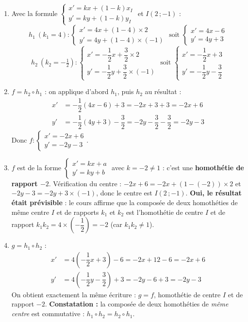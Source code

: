 \documentclass[11pt]{article}
\newcommand{\cle}[1]{{\popxbold\color{popdark}#1}}
\begin{document}
\begin{corrige}
\begin{enumerate}
\item Avec la formule $\begin{cases} x' = kx + (1-k)x_I \\ y' = ky + (1-k)y_I \end{cases}$ et $I(2\,;-1)$ :
\[ h_1 \ (k_1 = 4) : \begin{cases} x' = 4x + (1-4)\times 2 \\ y' = 4y + (1-4)\times(-1) \end{cases} \text{ soit } \begin{cases} x' = 4x - 6 \\ y' = 4y + 3 \end{cases} \]
\[ h_2 \ (k_2 = -\tfrac{1}{2}) : \begin{cases} x' = -\dfrac{1}{2}x + \dfrac{3}{2}\times 2 \\ y' = -\dfrac{1}{2}y + \dfrac{3}{2}\times(-1) \end{cases} \text{ soit } \begin{cases} x' = -\dfrac{1}{2}x + 3 \\ y' = -\dfrac{1}{2}y - \dfrac{3}{2} \end{cases} \]
\item $f = h_2 \circ h_1$ : on applique d'abord $h_1$, puis $h_2$ au résultat :
\begin{align*}
x' &= -\dfrac{1}{2}(4x - 6) + 3 = -2x + 3 + 3 = -2x + 6 \\
y' &= -\dfrac{1}{2}(4y + 3) - \dfrac{3}{2} = -2y - \dfrac{3}{2} - \dfrac{3}{2} = -2y - 3
\end{align*}
Donc $f : \begin{cases} x' = -2x + 6 \\ y' = -2y - 3 \end{cases}$.
\item $f$ est de la forme $\begin{cases} x' = kx + a \\ y' = ky + b \end{cases}$ avec $k = -2 \neq 1$ : c'est une \textbf{homothétie de rapport $-2$}. Vérification du centre : $-2x + 6 = -2x + (1-(-2))\times 2$ et $-2y - 3 = -2y + 3\times(-1)$, donc le centre est $I(2\,;-1)$. \textbf{Oui, le résultat était prévisible} : le cours affirme que la composée de deux homothéties de même centre $I$ et de rapports $k_1$ et $k_2$ est l'homothétie de centre $I$ et de rapport $k_1 k_2 = 4 \times \left(-\dfrac{1}{2}\right) = -2$ (car $k_1k_2 \neq 1$).
\item $g = h_1 \circ h_2$ :
\begin{align*}
x' &= 4\left(-\dfrac{1}{2}x + 3\right) - 6 = -2x + 12 - 6 = -2x + 6 \\
y' &= 4\left(-\dfrac{1}{2}y - \dfrac{3}{2}\right) + 3 = -2y - 6 + 3 = -2y - 3
\end{align*}
On obtient exactement la même écriture : $g = f$, homothétie de centre $I$ et de rapport $-2$. \textbf{Constatation :} la composée de deux homothéties de \emph{même centre} est \cle{commutative} : $h_1 \circ h_2 = h_2 \circ h_1$.
\end{enumerate}
\end{corrige}
\end{document}
